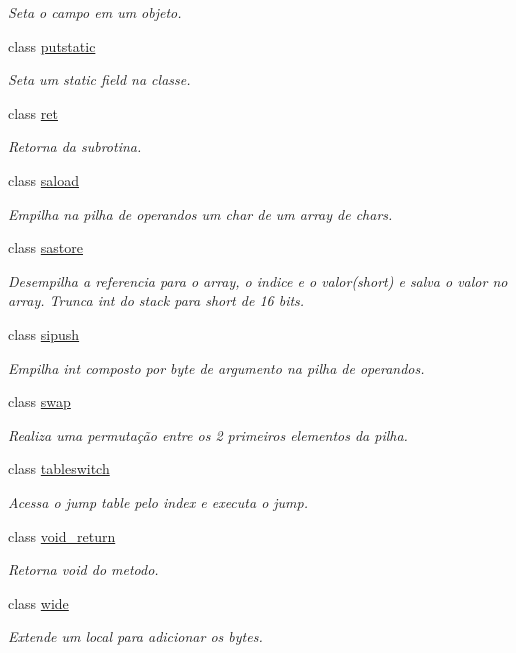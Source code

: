 \begin{DoxyCompactItemize}
\begin{DoxyCompactList}\small\item\em Seta o campo em um objeto. \end{DoxyCompactList}\item 
class \hyperlink{class_instruction_impl_1_1putstatic}{putstatic}
\begin{DoxyCompactList}\small\item\em Seta um static field na classe. \end{DoxyCompactList}\item 
class \hyperlink{class_instruction_impl_1_1ret}{ret}
\begin{DoxyCompactList}\small\item\em Retorna da subrotina. \end{DoxyCompactList}\item 
class \hyperlink{class_instruction_impl_1_1saload}{saload}
\begin{DoxyCompactList}\small\item\em Empilha na pilha de operandos um char de um array de chars. \end{DoxyCompactList}\item 
class \hyperlink{class_instruction_impl_1_1sastore}{sastore}
\begin{DoxyCompactList}\small\item\em Desempilha a referencia para o array, o indice e o valor(short) e salva o valor no array. Trunca int do stack para short de 16 bits. \end{DoxyCompactList}\item 
class \hyperlink{class_instruction_impl_1_1sipush}{sipush}
\begin{DoxyCompactList}\small\item\em Empilha int composto por byte de argumento na pilha de operandos. \end{DoxyCompactList}\item 
class \hyperlink{class_instruction_impl_1_1swap}{swap}
\begin{DoxyCompactList}\small\item\em Realiza uma permutação entre os 2 primeiros elementos da pilha. \end{DoxyCompactList}\item 
class \hyperlink{class_instruction_impl_1_1tableswitch}{tableswitch}
\begin{DoxyCompactList}\small\item\em Acessa o jump table pelo index e executa o jump. \end{DoxyCompactList}\item 
class \hyperlink{class_instruction_impl_1_1void__return}{void\+\_\+return}
\begin{DoxyCompactList}\small\item\em Retorna void do metodo. \end{DoxyCompactList}\item 
class \hyperlink{class_instruction_impl_1_1wide}{wide}
\begin{DoxyCompactList}\small\item\em Extende um local para adicionar os bytes. \end{DoxyCompactList}\end{DoxyCompactItemize}
